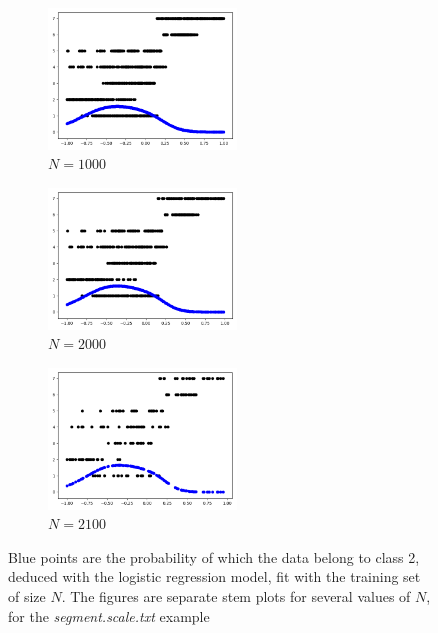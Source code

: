 \documentclass[12pt,letterpaper]{article}
\begin{document}
\begin{enumerate}[leftmargin=!,labelindent=5pt]
\begin{figure}[H]
        \begin{subfigure}{0.3\textwidth}
        \includegraphics[width=5cm]{images/log1000.jpg} 
        \caption{$N = 1000$}
        \label{fig:subim4}
        \end{subfigure}
        \begin{subfigure}{0.3\textwidth}
        \includegraphics[width=5cm]{images/log2000.jpg}
        \caption{$N = 2000$}
        \label{fig:subim5}
        \end{subfigure}
        \begin{subfigure}{0.3\textwidth}
        \includegraphics[width=5cm]{images/log2100.jpg}
        \caption{$N =2100$}
        \label{fig:subim6}
        \end{subfigure}
    \caption{Blue points are the probability of which the data belong to class 2, deduced with the logistic regression model, fit with the training set of  size $N$. The figures are separate stem plots for several values of $N$,  for the \textit{segment.scale.txt} example}
    \end{figure}
\end{enumerate}
\end{document}
